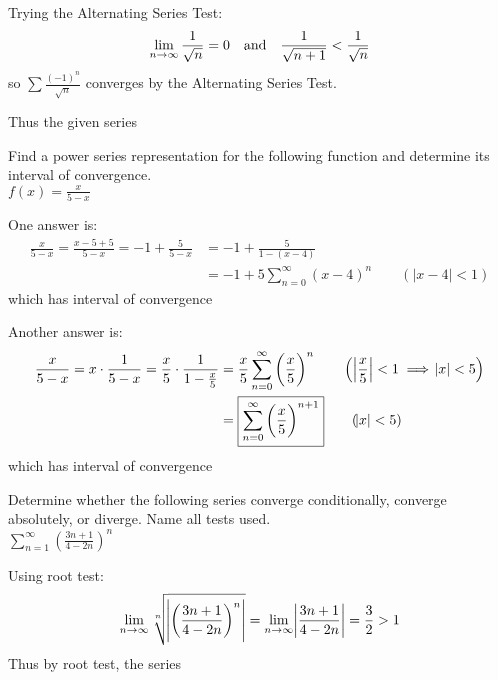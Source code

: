 \documentclass[12pt,answers]{exam}
\begin{document}
\begin{questions}
\begin{solution}
  Trying the Alternating Series Test:
  \[
    \lim_{n\to\infty} \frac{1}{\sqrt n} = 0
    \qand \frac{1}{\sqrt{n+1}} < \frac{1}{\sqrt n}
  \]
  so $\displaystyle \sum \frac{(-1)^n}{\sqrt n}$ converges by the Alternating Series Test.

  Thus the given series 
\end{solution}

\newpage
\question[10]
Find a power series representation for the following function and determine its interval of convergence. \\
$f(x) = \frac{x}{5-x}$
\begin{solution}
One answer is:
\begin{align*}
  \frac{x}{5-x}
  = \frac{x -5 + 5}{5-x}
  = -1 + \frac{5}{5-x}
   & = -1 + \frac{5}{1-(x-4)}                            \\
   & = \boxed{-1 + 5 \sum_{n=0}^\infty (x-4)^n} \qquad (|x-4|<1)
\end{align*}
which has interval of convergence 

Another answer is:
\begin{align*}
  \frac{x}{5-x}
  = x \cdot \frac{1}{5- x}
  = \frac x5 \cdot \frac{1}{1- \frac x5}
   & = \frac x5 \sum_{n=0}^\infty \left(\frac x5\right)^n \qquad \Bigl(\Bigl|\frac x5\Bigr| < 1 \implies \abs{x} < 5 \Bigr) \\
   & = \boxed{\sum_{n=0}^\infty \left(\frac x5\right)^{n+1}} \qquad (\abs{x}<5)
\end{align*}
which has interval of convergence 
\end{solution}

\question[10]
Determine whether the following series converge conditionally, converge absolutely, or diverge. Name all tests used. \\
$\sum_{n=1}^\infty \left(\frac{3n+1}{4-2n}\right)^n$
\begin{solution}
  Using root test:
  \[
    \lim_{n\to\infty} \sqrt[n]{\abs{\left(\frac{3n+1}{4-2n}\right)^n}}
    = \lim_{n\to\infty} \abs{\frac{3n+1}{4-2n}} = \frac32 > 1
  \]
  Thus by root test, the series 
\end{solution}


\end{questions}
\end{document}
